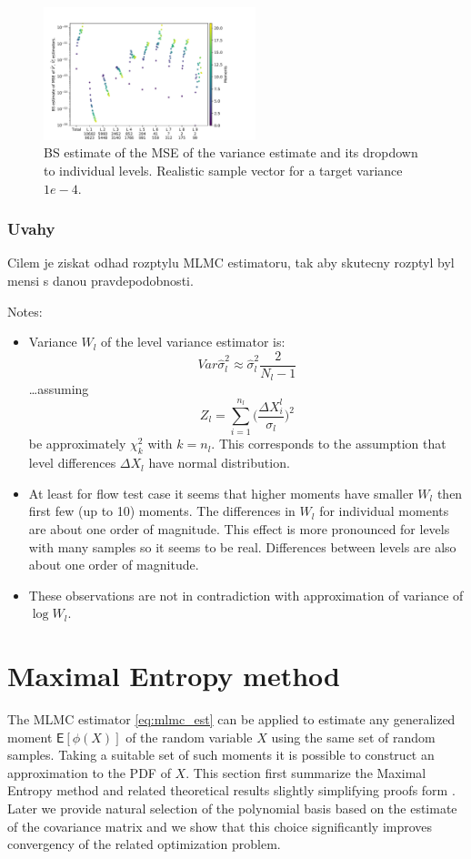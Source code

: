 \documentclass{article}
\def \E{{\mathsf E}}
\begin{document}
\begin{figure}
 \includegraphics[width=0.55\textwidth]{bs_var_var_composition.pdf}
 \caption{BS estimate of the MSE of the variance estimate and its dropdown to individual levels. Realistic sample vector for a target variance $1e-4$.}
 \label{fig:bs_var_var_comp}
\end{figure}


\subsubsection{Uvahy}
Cilem je ziskat odhad rozptylu MLMC estimatoru, tak aby skutecny rozptyl byl mensi s danou pravdepodobnosti. 

Notes:
\begin{itemize}
    \item Variance $W_l$ of the level variance estimator is:
    \[
        Var \hat\sigma_l^2 \approx \hat\sigma_l^2 \frac{2}{N_l - 1}
    \]
    \dots assuming
    \[
    Z_l = \sum_{i=1}^{n_l}\Big(\frac{\Delta X^l_i}{\sigma_l}\Big)^2
    \]
    be approximately $\chi^2_k$ with $k=n_l$. This corresponds to the assumption that level differences $\Delta X_l$ have normal distribution. 
    \item At least for flow test case it seems that higher moments have smaller $W_l$ then first few (up to 10) moments. The differences in $W_l$ for individual moments are about one order of magnitude.  This effect is more pronounced for levels with many samples so it seems to be real. Differences between levels are also about one order of magnitude.
    \item These observations are not in contradiction with approximation of variance of  $\log W_l$.
\end{itemize}


\section{Maximal Entropy method}

The MLMC  estimator \eqref{eq:mlmc_est} can be applied to estimate any generalized moment $\E[\phi(X)]$ 
of the random variable $X$ using the same set of random samples. Taking a suitable 
set of such moments it is possible to construct an approximation to the PDF of $X$. This section first
summarize the Maximal Entropy method and related theoretical results slightly simplifying proofs form \cite{Barron1991}. Later we provide natural selection of the polynomial basis based on the estimate of the covariance matrix and we show that this choice significantly improves convergency of the related optimization problem.
\end{document}
